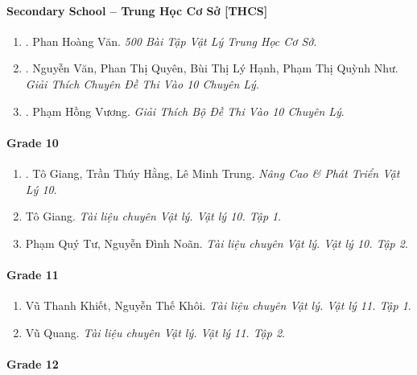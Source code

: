 \documentclass{article}
\begin{document}
\paragraph{Secondary School -- Trung Học Cơ Sở [THCS]}

\begin{enumerate}
	\item \cite{Van_500_BT_Vat_Ly_THCS}. Phan Hoàng Văn. {\it 500 Bài Tập Vật Lý Trung Học Cơ Sở}.\hfill{\sf[reading]}

	\item \cite{Van_Quyen_Hanh_Nhu_10_chuyen_Ly}. Nguyễn Văn, Phan Thị Quyên, Bùi Thị Lý Hạnh, Phạm Thị Quỳnh Như. {\it Giải Thích Chuyên Đề Thi Vào 10 Chuyên Lý}.\hfill{\sf[reading]}

	\item \cite{Vuong_10_chuyen_Ly}. Phạm Hồng Vương. {\it Giải Thích Bộ Đề Thi Vào 10 Chuyên Lý}.\hfill{\sf[reading]}
\end{enumerate}

\paragraph{Grade 10}

\begin{enumerate}
	\item \cite{Giang_Hang_Trung_ncpt_Vat_Ly_10}. Tô Giang, Trần Thúy Hằng, Lê Minh Trung. {\it Nâng Cao \& Phát Triển Vật Lý 10}.\hfill{\sf[reading]}

	\item Tô Giang. {\it Tài liệu chuyên Vật lý. Vật lý 10. Tập 1}.

	\item Phạm Quý Tư, Nguyễn Đình Noãn. {\it Tài liệu chuyên Vật lý. Vật lý 10. Tập 2}.
\end{enumerate}

\paragraph{Grade 11}

\begin{enumerate}
	\item Vũ Thanh Khiết, Nguyễn Thế Khôi. {\it Tài liệu chuyên Vật lý. Vật lý 11. Tập 1}.

	\item Vũ Quang. {\it Tài liệu chuyên Vật lý. Vật lý 11. Tập 2}.
\end{enumerate}

\paragraph{Grade 12}
\end{document}
